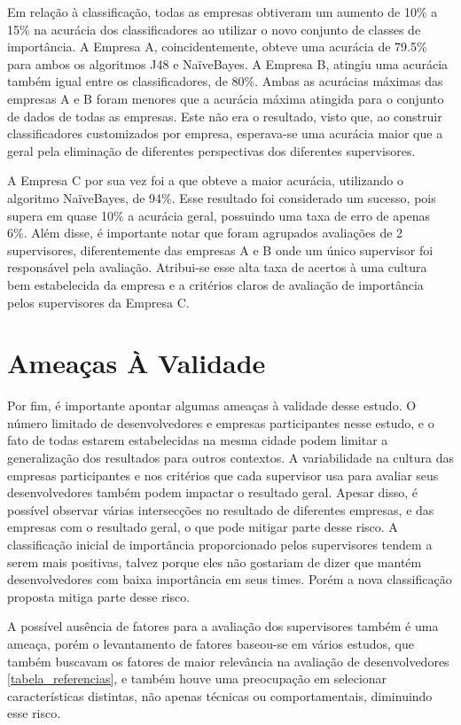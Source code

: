 Em relação à classificação, todas as empresas obtiveram um aumento de 10\% a 15\% na acurácia dos classificadores ao utilizar o novo conjunto de classes de importância. A Empresa A, coincidentemente, obteve uma acurácia de 79.5\% para ambos os algoritmos J48 e NaïveBayes. A Empresa B, atingiu uma acurácia também igual entre os classificadores, de 80\%. Ambas as acurácias máximas das empresas A e B foram menores que a acurácia máxima atingida para o conjunto de dados de todas as empresas. Este não era o resultado, visto que, ao construir classificadores customizados por empresa, esperava-se uma acurácia maior que a geral pela eliminação de diferentes perspectivas dos diferentes supervisores.

A Empresa C por sua vez foi a que obteve a maior acurácia, utilizando o algoritmo NaïveBayes, de 94\%. Esse resultado foi considerado um sucesso, pois supera em quase 10\% a acurácia geral, possuindo uma taxa de erro de apenas 6\%. Além disse, é importante notar que foram agrupados avaliações de 2 supervisores, diferentemente das empresas A e B onde um único supervisor foi responsável pela avaliação. Atribui-se esse alta taxa de acertos à uma cultura bem estabelecida da empresa e a critérios claros de avaliação de importância pelos supervisores da Empresa C.

\section{Ameaças À Validade}

Por fim, é importante apontar algumas ameaças à validade desse estudo. O número limitado de desenvolvedores e empresas participantes nesse estudo, e o fato de todas estarem estabelecidas na mesma cidade podem limitar a generalização dos resultados para outros contextos. A variabilidade na cultura das empresas participantes e nos critérios que cada supervisor usa para avaliar seus desenvolvedores também podem impactar o resultado geral. Apesar disso, é possível observar várias intersecções no resultado de diferentes empresas, e das empresas com o resultado geral, o que pode mitigar parte desse risco. A classificação inicial de importância proporcionado pelos supervisores tendem a serem mais positivas, talvez porque eles não gostariam de dizer que mantém desenvolvedores com baixa importância em seus times. Porém a nova classificação proposta mitiga parte desse risco.

A possível ausência de fatores para a avaliação dos supervisores também é uma ameaça, porém o levantamento de fatores baseou-se em vários estudos, que também buscavam os fatores de maior relevância na avaliação de desenvolvedores \autoref{tabela_referencias}, e também houve uma preocupação em selecionar características distintas, não apenas técnicas ou comportamentais, diminuindo esse risco.